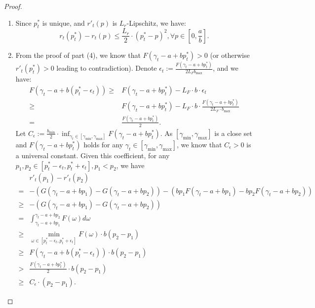 \begin{proof}
\begin{enumerate}
    \\
    \item Since $p_t^*$ is unique, and $r'_t(p)$ is $L_r$-Lipschitz, we have:
    \begin{equation}
        r_t(p_t^*)-r_t(p)\leq\frac{L_r}2\cdot(p_t^*-p)^2, \forall p\in[0, \frac{a}{b}].
    \end{equation}
    \item From the proof of part (4), we know that $F(\gamma_t-a+bp_t^*)>0$ (or otherwise $r'_t(p_t^*)>0$ leading to contradiction). Denote $\epsilon_t:=\frac{F(\gamma_t-a+bp_t^*)}{2L_Fb_{\max}}$, and we have:
    \begin{equation}
        \label{eq:epsilon_t}
        \begin{aligned}
            F(\gamma_t-a+b(p_t^*-\epsilon_t))\geq&F(\gamma_t-a+bp_t^*)-L_F\cdot b\cdot\epsilon_t\\
            \geq&F(\gamma_t-a+bp_t^*)-L_F\cdot b \cdot\frac{F(\gamma_t-a+bp_t^*)}{2L_F\cdot b_{\max}}\\
            =&\frac{F(\gamma_t-a+bp_t^*)}2.
        \end{aligned}
    \end{equation}
    Let $C_{\epsilon}:=\frac{b_{\min}}2\cdot\inf_{\gamma_t\in[\gamma_{\min}, \gamma_{\max}]} F(\gamma_t-a+bp_t^*)$. As $[\gamma_{\min}, \gamma_{\max}]$ is a close set and $F(\gamma_t-a+bp_t^*)$ holds for any $\gamma_t\in[\gamma_{\min}, \gamma_{\max}]$, we know that $C_{\epsilon}>0$ is a universal constant. Given this coefficient, for any $p_1, p_2\in[p_t^*-\epsilon_t, p_t^*+\epsilon_t], p_1<p_2$, we have
    \begin{equation}
        \label{eq:locally_strongly_concave}
        \begin{aligned}
            &r'_t(p_1) - r'_t(p_2)\\
            =&-(G(\gamma_t-a+bp_1)-G(\gamma_t-a+bp_2))-(bp_1F(\gamma_t-a+bp_1)-bp_2F(\gamma_t-a+bp_2))\\
            \geq&-(G(\gamma_t-a+bp_1)-G(\gamma_t-a+bp_2))\\
            =&\int_{\gamma_t-a+bp_1}^{\gamma_t-a+bp_2}F(\omega)d\omega\\
            \geq&\min_{\omega\in[p_t^*-\epsilon_t, p_t^*+\epsilon_t]}F(\omega)\cdot b(p_2-p_1)\\
            \geq&F(\gamma_t-a+b(p_t^*-\epsilon_t))\cdot b(p_2-p_1)\\
            >&\frac{F(\gamma_t-a+bp_t^*)}2\cdot b(p_2-p_1)\\
            \geq&C_{\epsilon}\cdot(p_2-p_1).

\end{aligned}
\end{equation}
\end{enumerate}
\end{proof}
